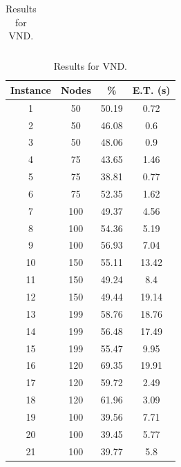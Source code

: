 \documentclass[10pt,twoside]{article}
\begin{document}
\begin{table}
{\begin{tabular}{cccc}
\end{tabular}
\caption{Results for SA.}
\label{tab:SA}
}
\hfill
\parbox{.45\linewidth}{
\centering
\begin{tabular}{cccc}
\hline
\textbf{Instance} & \textbf{Nodes} & \textbf{\%} & \textbf{E.T. (s)} \\ \hline
1                 & 50             & 50.19       & 0.72              \\
2                 & 50             & 46.08       & 0.6               \\
3                 & 50             & 48.06       & 0.9               \\
4                 & 75             & 43.65       & 1.46              \\
5                 & 75             & 38.81       & 0.77              \\
6                 & 75             & 52.35       & 1.62              \\
7                 & 100            & 49.37       & 4.56              \\
8                 & 100            & 54.36       & 5.19              \\
9                 & 100            & 56.93       & 7.04              \\
10                & 150            & 55.11       & 13.42             \\
11                & 150            & 49.24       & 8.4               \\
12                & 150            & 49.44       & 19.14             \\
13                & 199            & 58.76       & 18.76             \\
14                & 199            & 56.48       & 17.49             \\
15                & 199            & 55.47       & 9.95              \\
16                & 120            & 69.35       & 19.91             \\
17                & 120            & 59.72       & 2.49              \\
18                & 120            & 61.96       & 3.09              \\
19                & 100            & 39.56       & 7.71              \\
20                & 100            & 39.45       & 5.77              \\
21                & 100            & 39.77       & 5.8               \\ \hline
\end{tabular}
\caption{Results for VND.}
\label{tab:vnd}
}
\end{table}
\end{document}
